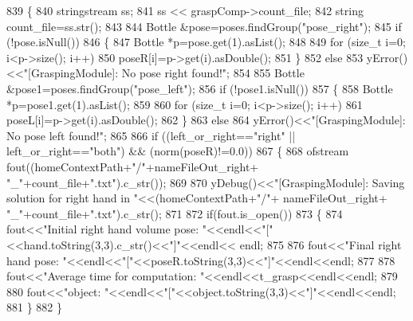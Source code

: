\begin{DoxyCode}
839 \{
840     stringstream ss;
841     ss << graspComp->count\_file;
842     \textcolor{keywordtype}{string} count\_file=ss.str();
843 
844     Bottle &pose=poses.findGroup(\textcolor{stringliteral}{"pose\_right"});
845     \textcolor{keywordflow}{if} (!pose.isNull())
846     \{
847         Bottle *p=pose.get(1).asList();
848 
849         \textcolor{keywordflow}{for} (\textcolor{keywordtype}{size\_t} i=0; i<p->size(); i++)
850             poseR[i]=p->get(i).asDouble();
851     \}
852     \textcolor{keywordflow}{else}
853         yError()<<\textcolor{stringliteral}{"[GraspingModule]: No pose right found!"};
854 
855     Bottle &pose1=poses.findGroup(\textcolor{stringliteral}{"pose\_left"});
856     \textcolor{keywordflow}{if} (!pose1.isNull())
857     \{
858         Bottle *p=pose1.get(1).asList();
859 
860         \textcolor{keywordflow}{for} (\textcolor{keywordtype}{size\_t} i=0; i<p->size(); i++)
861             poseL[i]=p->get(i).asDouble();
862     \}
863     \textcolor{keywordflow}{else}
864         yError()<<\textcolor{stringliteral}{"[GraspingModule]: No pose left found!"};
865 
866     \textcolor{keywordflow}{if} ((left\_or\_right==\textcolor{stringliteral}{"right"} || left\_or\_right==\textcolor{stringliteral}{"both"}) && (norm(poseR)!=0.0))
867     \{
868         ofstream fout((homeContextPath+\textcolor{stringliteral}{"/"}+nameFileOut\_right+ \textcolor{stringliteral}{"\_"}+count\_file+\textcolor{stringliteral}{".txt"}).c\_str());
869 
870         yDebug()<<\textcolor{stringliteral}{"[GraspingModule]: Saving solution for right hand in "}<<(homeContextPath+\textcolor{stringliteral}{"/"}+
      nameFileOut\_right+ \textcolor{stringliteral}{"\_"}+count\_file+\textcolor{stringliteral}{".txt"}).c\_str();
871 
872         \textcolor{keywordflow}{if}(fout.is\_open())
873         \{
874             fout<<\textcolor{stringliteral}{"Initial right hand volume pose: "}<<endl<<\textcolor{stringliteral}{"["}<<hand.toString(3,3).c\_str()<<\textcolor{stringliteral}{"]"}<<endl<<
      endl;
875 
876             fout<<\textcolor{stringliteral}{"Final right hand pose: "}<<endl<<\textcolor{stringliteral}{"["}<<poseR.toString(3,3)<<\textcolor{stringliteral}{"]"}<<endl<<endl;
877 
878             fout<<\textcolor{stringliteral}{"Average time for computation: "}<<endl<<t\_grasp<<endl<<endl;
879 
880             fout<<\textcolor{stringliteral}{"object: "}<<endl<<\textcolor{stringliteral}{"["}<<\textcolor{keywordtype}{object}.toString(3,3)<<\textcolor{stringliteral}{"]"}<<endl<<endl;
881         \}  
882     \}

\end{DoxyCode}
